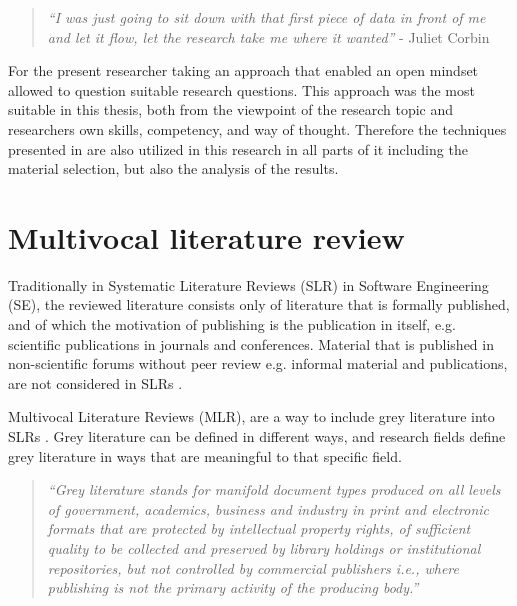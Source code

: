 \documentclass[english, 12pt, a4paper, sci, utf8, a-1b, online]{aaltothesis}
\begin{document}
\begin{quotation}
  \textit{``I was just going to sit down with that first piece of data in front of me and let it flow, let the research take me where it wanted''} - Juliet Corbin \parencite[p.~43]{developing-grounded-theory}
\end{quotation}

For the present researcher taking an approach that enabled an open mindset allowed to question suitable research questions. This approach was the most suitable in this thesis, both from the viewpoint of the research topic and researchers own skills, competency, and way of thought. Therefore the techniques presented in \textcite{developing-grounded-theory} are also utilized in this research in all parts of it including the material selection, but also the analysis of the results.

\clearpage
\section{Multivocal literature review} \label{section:multivocal-literature-review}

Traditionally in Systematic Literature Reviews (SLR) in Software Engineering (SE), the reviewed literature consists only of literature that is formally published, and of which the motivation of publishing is the publication in itself, e.g. scientific publications in journals and conferences. Material that is published in non-scientific forums without peer review e.g. informal material and publications, are not considered in SLRs \parencite{guidelines-for-MLR}.

Multivocal Literature Reviews (MLR), are a way to include grey literature into SLRs \parencite{the-need-for-MLR}. Grey literature can be defined in different ways, and research fields define grey literature in ways that are meaningful to that specific field.

\begin{quotation}
  \textit{``Grey literature stands for manifold document types produced on all levels of government, academics, business and industry in print and electronic formats that are protected by intellectual property rights, of sufficient quality to be collected and preserved by library holdings or institutional repositories, but not controlled by commercial publishers i.e., where publishing is not the primary activity of the producing body.''} \parencite{towards-a-prague-definition-of-grey-literature}
\end{quotation}
\end{document}
